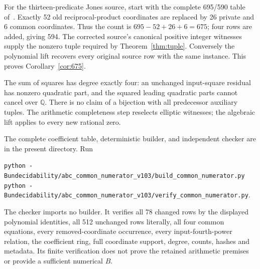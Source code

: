 \documentclass[11pt]{article}
\newcommand{\Q}{\mathbb Q}\newcommand{\Z}{\mathbb Z}
\begin{document}
For the thirteen-predicate Jones source, start with the complete
695/590 table of~\cite{signed}. Exactly 52 old reciprocal-product
coordinates are replaced by 26 private and 6 common coordinates.
Thus the count is $695-52+26+6=675$; four rows are added, giving 594.
The corrected source's canonical positive integer witnesses supply the
nonzero tuple required by Theorem~\ref{thm:tuple}. Conversely the
polynomial lift recovers every original source row with the same
instance. This proves Corollary~\ref{cor:675}.

The sum of squares has degree exactly four: an unchanged input-square
residual has nonzero quadratic part, and the squared leading quadratic
parts cannot cancel over $\Q$. There is no claim of a bijection with
all predecessor auxiliary tuples. The arithmetic completeness step
reselects elliptic witnesses; the algebraic lift applies to every new
rational zero.

The complete coefficient table, deterministic builder, and independent
checker are in the present directory. Run
\begin{center}\small
\texttt{python -B}\enspace\nolinkurl{undecidability/abc_common_numerator_v103/build_common_numerator.py}\\
\texttt{python -B}\enspace\nolinkurl{undecidability/abc_common_numerator_v103/verify_common_numerator.py}.
\end{center}
The checker imports no builder. It verifies all 78 changed rows by the
displayed polynomial identities, all 512 unchanged rows literally,
all four common equations, every removed-coordinate occurrence, every
input-fourth-power relation, the coefficient ring, full coordinate
support, degree, counts, hashes and metadata. Its finite verification
does not prove the retained arithmetic premises or provide a sufficient
numerical $B$.
\end{document}
